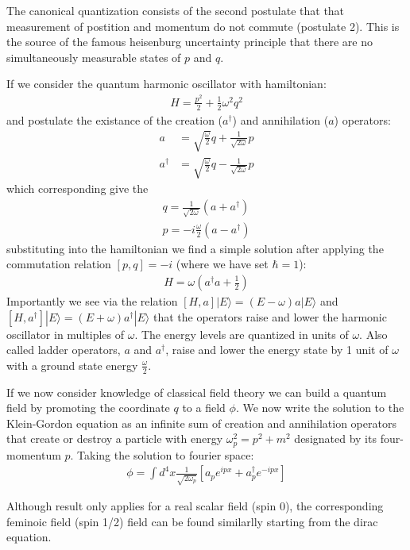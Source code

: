 The canonical quantization consists of the second postulate that that measurement of postition
and momentum do not commute (postulate 2). This is the source of the famous heisenburg uncertainty
principle that there are no simultaneously measurable states of $p$ and $q$. 

If we consider the quantum harmonic oscillator with hamiltonian:
\begin{align*}
H = \frac{p^2}{2} + \frac{1}{2}\omega^2 q^2
\end{align*}
and postulate the existance of the creation ($a^\dagger$) and annihilation ($a$) operators:
\begin{align*}
a &= \sqrt{\frac{\omega}{2}}q + \frac{1}{\sqrt{2\omega}}p \\
a^\dagger &= \sqrt{\frac{\omega}{2}}q - \frac{1}{\sqrt{2\omega}}p 
\end{align*}
which corresponding give the 
\begin{align*}
q = \frac{1}{\sqrt{2\omega}} (a + a^\dagger)\\
p = -i \frac{\omega}{2}( a - a^\dagger) 
\end{align*}
 substituting into the hamiltonian we find a simple solution after applying
the commutation relation $[p,q]=-i$ (where we have set $\hbar=1$):
\begin{align*}
H =  \omega(a^\dagger a + \frac{1}{2}) 
\end{align*}
Importantly we see via the relation $[H,a]|E\rangle = (E-\omega)a|E\rangle$ and 
$[H,a^\dagger]|E\rangle = (E+\omega)a^\dagger|E\rangle$ that the operators raise and 
lower the harmonic oscillator in multiples of $\omega$. The energy levels are quantized 
in units of $\omega$. Also called ladder operators, $a$ and $a^\dagger$, raise and lower
the energy state by 1 unit of $\omega$ with a ground state energy $\frac{\omega}{2}$. 

If we now consider knowledge of classical field theory we can build a quantum field by
promoting the coordinate $q$ to a field $\phi$. We now write
the solution to the Klein-Gordon equation as an infinite sum of creation and 
annihilation operators that create or destroy a particle with energy $\omega_p^2 =
p^2 + m^2$ designated by its four-momentum $p$. Taking the solution to fourier space:
\begin{align*}
\phi = \int d^4x \frac{1}{\sqrt{2\omega_{p}}} \left [  a_p e^{ipx} + a_p^\dagger e^{-ipx} \right ]
\end{align*} 

Although result only applies for a real scalar field (spin 0), the corresponding feminoic field (spin 1/2)
field can be found similarlly starting from the dirac equation. 

